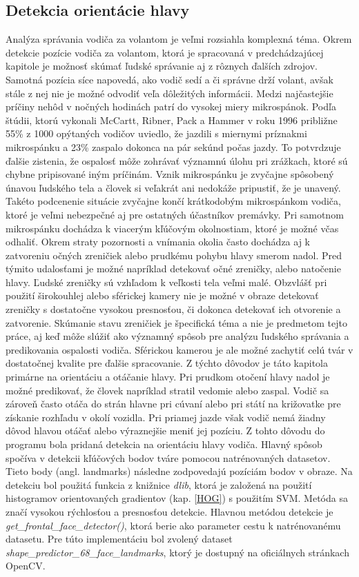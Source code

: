 \documentclass[slovak,master,dept460,male,cpp,cpdeclaration]{diploma}
\begin{document}
\subsection{Detekcia orientácie hlavy}
\label{sec:headOrientation}
Analýza správania vodiča za volantom je  veľmi rozsiahla komplexná téma. Okrem detekcie pozície vodiča za volantom, ktorá je spracovaná v predchádzajúcej kapitole je možnosť skúmať ľudské správanie aj z rôznych ďalších zdrojov. Samotná pozícia  síce napovedá, ako vodič sedí a či správne drží volant, avšak  stále z nej nie je možné odvodiť veľa dôležitých informácii.  Medzi najčastejšie príčiny nehôd v nočných hodinách patrí do vysokej miery mikrospánok. Podľa štúdii\cite{mccartt1996scope}, ktorú vykonali McCartt, Ribner, Pack a Hammer  v roku 1996 približne 55\% z 1000 opýtaných vodičov uviedlo, že jazdili s miernymi príznakmi mikrospánku a 23\% zaspalo dokonca na pár sekúnd počas jazdy. To potvrdzuje ďalšie zistenia, že ospalosť môže zohrávať významnú úlohu pri zrážkach, ktoré sú chybne pripisované iným príčinám. Vznik mikrospánku je zvyčajne spôsobený únavou ľudského tela  a človek si veľakrát ani nedokáže pripustiť, že je unavený. Takéto podcenenie situácie zvyčajne končí krátkodobým mikrospánkom  vodiča, ktoré je  veľmi nebezpečné aj pre ostatných účastníkov premávky.  Pri samotnom mikrospánku dochádza  k viacerým kľúčovým okolnostiam, ktoré je možné včas odhaliť. Okrem straty pozornosti a vnímania okolia často dochádza aj k zatvoreniu očných zreničiek alebo prudkému pohybu hlavy smerom nadol. Pred týmito udalosťami je možné napríklad detekovať  očné zreničky, alebo natočenie hlavy. Ľudské zreničky sú vzhľadom  k veľkosti tela veľmi malé. Obzvlášť pri použití širokouhlej alebo sférickej kamery nie je možné v obraze detekovať  zreničky s dostatočne vysokou presnosťou, či dokonca detekovať ich otvorenie a zatvorenie.  Skúmanie stavu zreničiek je špecifická téma a nie je predmetom tejto práce, aj keď môže slúžiť ako významný spôsob pre analýzu ľudského správania  a predikovania ospalosti vodiča. Sférickou kamerou je ale možné  zachytiť celú tvár v dostatočnej kvalite pre ďalšie spracovanie. Z týchto dôvodov je  táto kapitola  primárne na orientáciu a otáčanie hlavy. Pri prudkom otočení hlavy nadol je možné predikovať, že človek napríklad stratil vedomie alebo zaspal. Vodič sa zároveň často otáča do strán  hlavne pri cúvaní alebo pri  státí na križovatke pre získanie rozhľadu v okolí vozidla.  Pri priamej jazde však vodič nemá žiadny dôvod hlavou otáčať alebo výraznejšie meniť jej pozíciu. Z tohto dôvodu  do programu  bola pridaná detekcia na orientáciu hlavy vodiča. Hlavný spôsob spočíva v detekcii  kľúčových bodov tváre pomocou natrénovaných datasetov.  Tieto body (angl. landmarks) následne zodpovedajú pozíciám bodov v obraze. Na detekciu bol použitá funkcia z knižnice \textit{dlib}, ktorá je založená na použití histogramov orientovaných gradientov (kap. \ref{HOG}) s použitím SVM. Metóda sa značí vysokou rýchlosťou a presnosťou detekcie.  Hlavnou metódou detekcie je \textit{get\_frontal\_face\_detector()}, ktorá berie ako parameter cestu k natrénovanému datasetu. Pre túto implementáciu bol zvolený dataset \textit{shape\_predictor\_68\_face\_landmarks}, ktorý je dostupný na oficiálnych stránkach OpenCV. 
\end{document}
